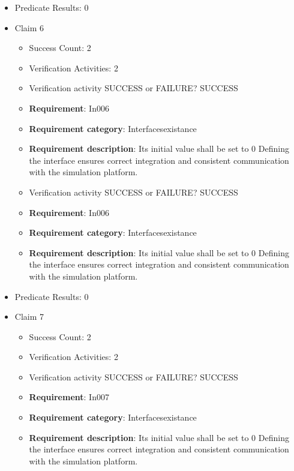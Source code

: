 \documentclass{article}
\begin{document}
\begin{itemize}
\begin{itemize}
				\end{itemize}
				
									    
				\item Predicate Results: 0

  				  \item Claim 6
				\begin{itemize}
			    	\item Success Count: 2 
			    	\item Verification Activities: 2
					\item Verification activity SUCCESS or FAILURE? SUCCESS
		
						\item \textbf{Requirement}: In006 
						\item \textbf{Requirement category}: Interfacesexistance 
						\item \textbf{Requirement description}: Its initial value shall be set to 0 Defining the interface ensures correct integration and consistent communication with the simulation platform.
					
					\item Verification activity SUCCESS or FAILURE? SUCCESS
		
						\item \textbf{Requirement}: In006 
						\item \textbf{Requirement category}: Interfacesexistance 
						\item \textbf{Requirement description}: Its initial value shall be set to 0 Defining the interface ensures correct integration and consistent communication with the simulation platform.
					
				\end{itemize}
				
									    
				\item Predicate Results: 0

  				  \item Claim 7
				\begin{itemize}
			    	\item Success Count: 2 
			    	\item Verification Activities: 2
					\item Verification activity SUCCESS or FAILURE? SUCCESS
		
						\item \textbf{Requirement}: In007 
						\item \textbf{Requirement category}: Interfacesexistance 
						\item \textbf{Requirement description}: Its initial value shall be set to 0 Defining the interface ensures correct integration and consistent communication with the simulation platform.
					

\end{itemize}
\end{itemize}
\end{document}
